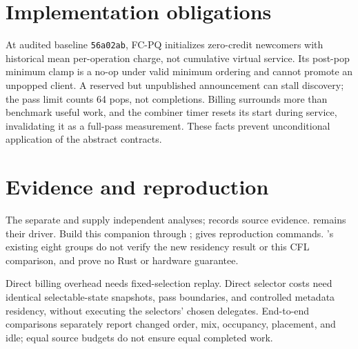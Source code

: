 \section{Implementation obligations}
\label{app:implementation}
At audited baseline \texttt{56a02ab}, FC-PQ initializes zero-credit newcomers
with historical mean per-operation charge, not cumulative virtual service.
Its post-pop minimum clamp is a no-op under valid minimum ordering and
cannot promote an unpopped client. A reserved but unpublished announcement
can stall discovery; the pass limit counts 64 pops, not completions.
Billing surrounds more than benchmark useful work, and the combiner timer
resets its start during service, invalidating it as a full-pass measurement.
These facts prevent unconditional application of the abstract contracts.

\section{Evidence and reproduction}
\label{app:evidence}
The separate  and  supply independent
analyses;  records source evidence.
 remains their driver. Build this companion through
;  gives reproduction commands.
's existing eight groups do not verify the new residency
result or this CFL comparison, and prove no Rust or hardware guarantee.

Direct billing overhead needs fixed-selection replay. Direct selector costs
need identical selectable-state snapshots, pass boundaries, and controlled
metadata residency, without executing the selectors' chosen delegates.
End-to-end comparisons separately report changed order, mix, occupancy,
placement, and idle; equal source budgets do not ensure equal completed work.
